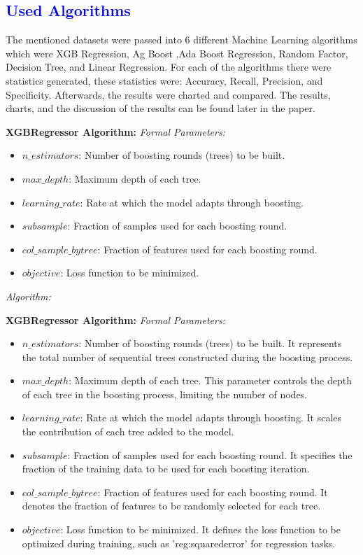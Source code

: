 \documentclass[conference]{IEEEtran}
\newcommand{\mar}[1]{\textcolor{blue}{#1}}
\begin{document}
 \mar{\subsection{\textbf{\large Used Algorithms}}}
The mentioned datasets were passed into 6 different Machine Learning algorithms which were XGB Regression, Ag Boost ,Ada Boost Regression, Random Factor, Decision Tree, and Linear Regression. For each of the algorithms there were statistics generated, these statistics were: Accuracy, Recall, Precision, and Specificity. Afterwards, the results were charted and compared. The results, charts, and the discussion of the results can be found later in the paper.\textcolor{blue}{\citep{9122958}}
\newline
\newline
\item \textbf{XGBRegressor Algorithm:}
\newline
\textit{Formal Parameters:}
\begin{itemize}
    \item $n\_estimators$: Number of boosting rounds (trees) to be built.
    \item $max\_depth$: Maximum depth of each tree.
    \item $learning\_rate$: Rate at which the model adapts through boosting.
    \item $subsample$: Fraction of samples used for each boosting round.
    \item $col\_sample\_bytree$: Fraction of features used for each boosting round.
    \item $objective$: Loss function to be minimized.
\end{itemize}

\textit{Algorithm:}
\item \textbf{XGBRegressor Algorithm:}
\newline
\textit{Formal Parameters:}
\begin{itemize}
    \item $n\_estimators$: Number of boosting rounds (trees) to be built. It represents the total number of sequential trees constructed during the boosting process.
    \item $max\_depth$: Maximum depth of each tree. This parameter controls the depth of each tree in the boosting process, limiting the number of nodes.
    \item $learning\_rate$: Rate at which the model adapts through boosting. It scales the contribution of each tree added to the model.
    \item $subsample$: Fraction of samples used for each boosting round. It specifies the fraction of the training data to be used for each boosting iteration.
    \item $col\_sample\_bytree$: Fraction of features used for each boosting round. It denotes the fraction of features to be randomly selected for each tree.
    \item $objective$: Loss function to be minimized. It defines the loss function to be optimized during training, such as 'reg:squarederror' for regression tasks.
\end{itemize}
\end{document}
